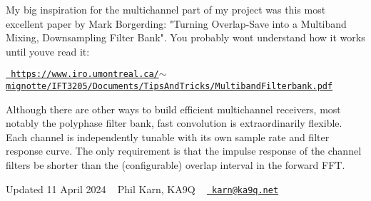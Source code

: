My big inspiration for the multichannel part of my project was this most excellent paper by Mark Borgerding\+: "{}\+Turning Overlap-\/\+Save into a \+Multiband Mixing, Downsampling Filter Bank"{}. You probably won\textquotesingle{}t understand how it works until you\textquotesingle{}ve read it\+:

\href{https://www.iro.umontreal.ca/~mignotte/IFT3205/Documents/TipsAndTricks/MultibandFilterbank.pdf}{\texttt{ https\+://www.\+iro.\+umontreal.\+ca/\texorpdfstring{$\sim$}{\string~}mignotte/\+IFT3205/\+Documents/\+Tips\+And\+Tricks/\+Multiband\+Filterbank.\+pdf}}

Although there are other ways to build efficient multichannel receivers, most notably the polyphase filter bank, fast convolution is extraordinarily flexible. Each channel is independently tunable with its own sample rate and filter response curve. The only requirement is that the impulse response of the channel filters be shorter than the (configurable) overlap interval in the forward FFT.

Updated 11 April 2024 ~\newline
 Phil Karn, KA9Q ~\newline
 \href{mailto:karn@ka9q.net}{\texttt{ karn@ka9q.\+net}} 
